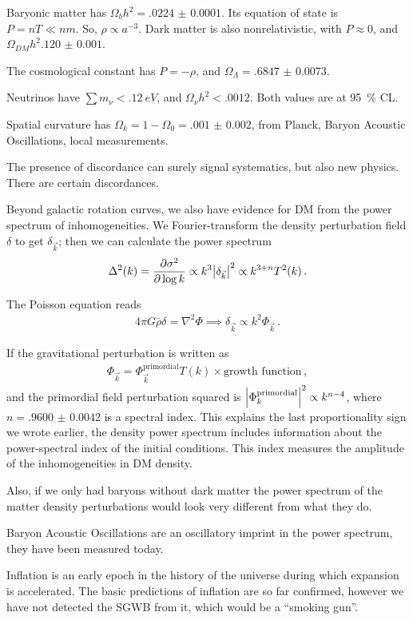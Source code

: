 \documentclass[main.tex]{subfiles}
\begin{document}
Baryonic matter has \(\Omega_b h^2 = \num{.0224(1)}\).
Its equation of state is \(P = nT \ll nm\). So,  \(\rho \propto a^{-3}\). 
Dark matter is also nonrelativistic, with \(P \approx 0\), and \(\Omega_{DM} h^2 \num{.120(1)}\).

The cosmological constant has \(P = - \rho \), and \(\Omega _\Lambda = \num{.6847(73)}\). 

Neutrinos have \(\sum m_\nu < \SI{.12}{eV}\), and \(\Omega _\nu h^2 < \num{.0012}\). Both values are at \SI{95}{\percent} CL. 

Spatial curvature has \(\Omega _k = 1- \Omega_0 = \num{.001(2)}\), from Planck, Baryon Acoustic Oscillations, local measurements.

The presence of discordance can surely signal systematics, but also new physics. There are certain discordances. 

Beyond galactic rotation curves, we also have evidence for DM from the power spectrum of inhomogeneities. 
We Fourier-transform the density perturbation field \(\delta \) to get \(\delta _{\vec{k}}\); then we can calculate the power spectrum 
%
\begin{align}
\Delta^2 (k) = \pdv{ \sigma^2}{\log k} \propto k^3 \abs{ \delta _{\vec{k}}}^2 \propto k^{3+n} T^2 (k)
\,.
\end{align}

The Poisson equation reads 
%
\begin{align}
4 \pi G \overline{\rho} \delta = \nabla^2 \Phi \implies \delta _{\vec{k}} \propto k^2 \Phi_{\vec{k}}
\,.
\end{align}

If the gravitational perturbation is written as 
%
\begin{align}
\Phi _{\vec{k}} = \Phi _{\vec{k}}^{\text{primordial}} T(k) \times \text{growth function}
\,,
\end{align}
%
and the primordial field perturbation squared is \(\abs{\Phi _k^{\text{primordial}}}^2 \propto k^{n-4}\), where \(n =\num{.9600(42)}\) is a spectral index. This explains the last proportionality sign we wrote earlier, the density power spectrum includes information about the power-spectral index of the initial conditions. This index measures the amplitude of the inhomogeneities in DM density. 

Also, if we only had baryons without dark matter the power spectrum of the matter density perturbations would look very different from what they do.

Baryon Acoustic Oscillations are an oscillatory imprint in the power spectrum, they have been measured today.

Inflation is an early epoch in the history of the universe during which expansion is accelerated. 
The basic predictions of inflation are so far confirmed, however we have not detected the SGWB from it, which would be a ``smoking gun''.
\end{document}
